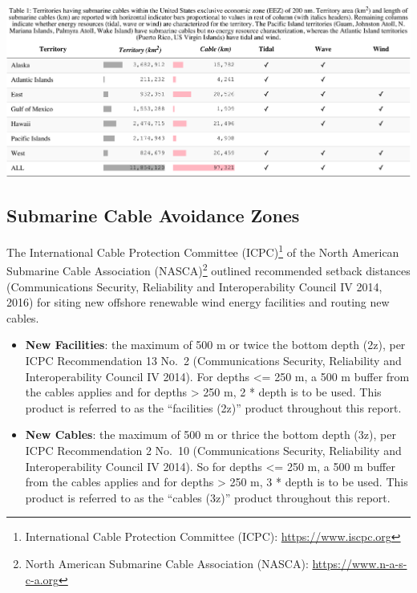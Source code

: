 \documentclass[]{article}
\let\rmarkdownfootnote\footnote%
\def\footnote{\protect\rmarkdownfootnote}
\begin{document}
\includegraphics{report_files/figure-latex/tbl01Territories-1.pdf}

\hypertarget{submarine-cable-avoidance-zones}{%
\subsection{Submarine Cable Avoidance
Zones}\label{submarine-cable-avoidance-zones}}

The International Cable Protection Committee (ICPC)\footnote{International
  Cable Protection Committee (ICPC): \url{https://www.iscpc.org}} of the
North American Submarine Cable Association (NASCA)\footnote{North
  American Submarine Cable Association (NASCA):
  \url{https://www.n-a-s-c-a.org}} outlined recommended setback
distances (Communications Security, Reliability and Interoperability
Council IV 2014, 2016) for siting new offshore renewable wind energy
facilities and routing new cables.

\begin{itemize}
\item
  \textbf{New Facilities}: the maximum of 500 m or twice the bottom
  depth (2z), per ICPC Recommendation 13 No.~2 (Communications Security,
  Reliability and Interoperability Council IV 2014). For depths
  \textless{}= 250 m, a 500 m buffer from the cables applies and for
  depths \textgreater{} 250 m, 2 * depth is to be used. This product is
  referred to as the ``facilities (2z)'' product throughout this report.
\item
  \textbf{New Cables}: the maximum of 500 m or thrice the bottom depth
  (3z), per ICPC Recommendation 2 No.~10 (Communications Security,
  Reliability and Interoperability Council IV 2014). So for depths
  \textless{}= 250 m, a 500 m buffer from the cables applies and for
  depths \textgreater{} 250 m, 3 * depth is to be used. This product is
  referred to as the ``cables (3z)'' product throughout this report.
\end{itemize}
\end{document}

